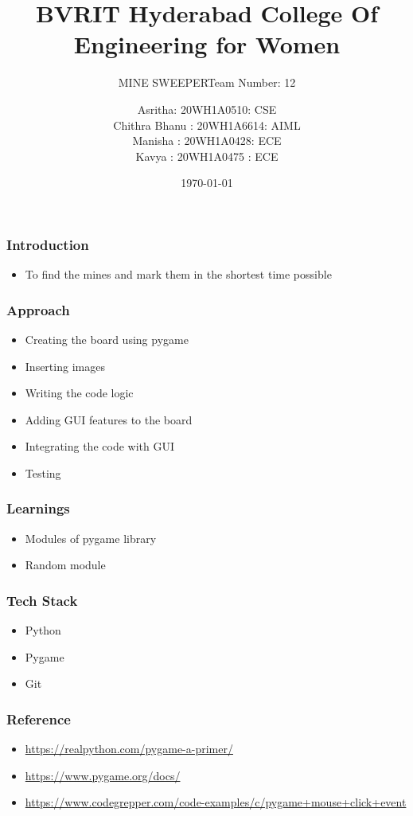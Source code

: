 \documentclass[14pt]{beamer}
\title{BVRIT Hyderabad College Of Engineering for Women}
\subtitle{MINE SWEEPER}
\subtitle{Team Number: 12}
\date{\today}
\author[Bvrith]{Asritha: 20WH1A0510: CSE \\ Chithra Bhanu : 20WH1A6614: AIML  \\ Manisha : 20WH1A0428: ECE  \\ Kavya : 20WH1A0475 : ECE}
\begin{document}
    \begin{frame}
        \titlepage
    \end{frame}
    \begin{frame}
	\frametitle{Introduction}
        \begin{itemize}
	    \item To find the mines and mark them in the shortest time possible
	\end{itemize}
    \end{frame}
    \begin{frame}
	\frametitle{Approach}
	\begin{itemize}
	    \item Creating the board using pygame\\
        \item Inserting images\\
        \item Writing the code logic 
	    \item Adding GUI features to the board \\
	    \item Integrating the code with GUI
	    \item Testing

	\end{itemize}
    \end{frame}
    \begin{frame}
        \frametitle{Learnings}
	\begin{itemize}
	    \item Modules of pygame library
	    \item Random module 
	\end{itemize}
    \end{frame}
    \begin{frame}
        \frametitle{Tech Stack}
	\begin{itemize}
	    \item Python 
	    \item Pygame
	    \item Git
	\end{itemize}
    \end{frame}
 \begin{frame}
        \frametitle{Reference}
	\begin{itemize}
	    \item  \url{https://realpython.com/pygame-a-primer/}
	     \item \url{https://www.pygame.org/docs/}
	      \item \url{https://www.codegrepper.com/code-examples/c/pygame+mouse+click+event}
	\end{itemize}
    \end{frame}
\end{document}

